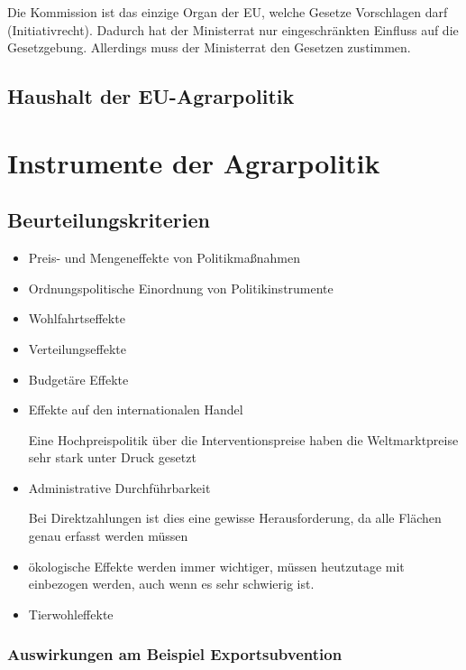 \documentclass[11pt]{scrartcl}
\begin{document}
Die Kommission ist das einzige Organ der \ac{EU}, welche Gesetze Vorschlagen darf (Initiativrecht).
Dadurch hat der Ministerrat nur eingeschränkten Einfluss auf die Gesetzgebung.
Allerdings muss der Ministerrat den Gesetzen zustimmen.


\subsection{Haushalt der \ac{EU}-Agrarpolitik}


\section{Instrumente der Agrarpolitik}

\subsection{Beurteilungskriterien}

\begin{itemize}
	\item Preis- und Mengeneffekte von Politikmaßnahmen
	\item Ordnungspolitische Einordnung von Politikinstrumente
	\item Wohlfahrtseffekte
	\item Verteilungseffekte
	\item Budgetäre Effekte
	\item Effekte auf den internationalen Handel
		
		Eine Hochpreispolitik über die Interventionspreise haben die Weltmarktpreise sehr stark unter Druck gesetzt

	\item Administrative Durchführbarkeit
		
		Bei Direktzahlungen ist dies eine gewisse Herausforderung, da alle Flächen genau erfasst werden müssen

	\item ökologische Effekte
		werden immer wichtiger, müssen heutzutage mit einbezogen werden, auch wenn es sehr schwierig ist.
	\item Tierwohleffekte
\end{itemize}


\subsubsection{Auswirkungen am Beispiel Exportsubvention}
\end{document}
